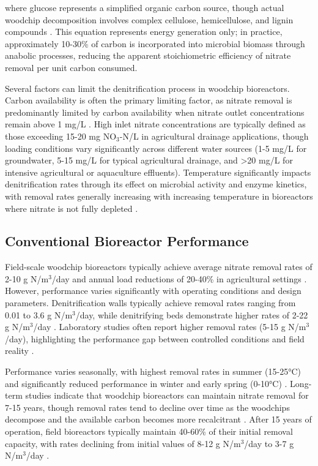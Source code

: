 \documentclass[12pt,a4paper]{article}
\begin{document}
where glucose represents a simplified organic carbon source, though actual woodchip decomposition involves complex cellulose, hemicellulose, and lignin compounds \citep{RN725}. This equation represents energy generation only; in practice, approximately 10-30\% of carbon is incorporated into microbial biomass through anabolic processes, reducing the apparent stoichiometric efficiency of nitrate removal per unit carbon consumed.

Several factors can limit the denitrification process in woodchip bioreactors. Carbon availability is often the primary limiting factor, as nitrate removal is predominantly limited by carbon availability when nitrate outlet concentrations remain above 1 mg/L \citep{RN629, RN242}. High inlet nitrate concentrations are typically defined as those exceeding 15-20 mg NO$_3$-N/L in agricultural drainage applications, though loading conditions vary significantly across different water sources (1-5 mg/L for groundwater, 5-15 mg/L for typical agricultural drainage, and >20 mg/L for intensive agricultural or aquaculture effluents). Temperature significantly impacts denitrification rates through its effect on microbial activity and enzyme kinetics, with removal rates generally increasing with increasing temperature in bioreactors where nitrate is not fully depleted \citep{RN625, RN228, RN258}.

\subsection{Conventional Bioreactor Performance}

Field-scale woodchip bioreactors typically achieve average nitrate removal rates of 2-10 g N/m$^3$/day and annual load reductions of 20-40\% in agricultural settings \citep{RN312, RN310}. However, performance varies significantly with operating conditions and design parameters. Denitrification walls typically achieve removal rates ranging from 0.01 to 3.6 g N/m$^3$/day, while denitrifying beds demonstrate higher rates of 2-22 g N/m$^3$/day \citep{RN625, RN629}. Laboratory studies often report higher removal rates (5-15 g N/m$^3$/day), highlighting the performance gap between controlled conditions and field reality \citep{RN611}.

Performance varies seasonally, with highest removal rates in summer (15-25°C) and significantly reduced performance in winter and early spring (0-10°C) \citep{RN214, RN228, RN258}. Long-term studies indicate that woodchip bioreactors can maintain nitrate removal for 7-15 years, though removal rates tend to decline over time as the woodchips decompose and the available carbon becomes more recalcitrant \citep{RN629, RN958}. After 15 years of operation, field bioreactors typically maintain 40-60\% of their initial removal capacity, with rates declining from initial values of 8-12 g N/m$^3$/day to 3-7 g N/m$^3$/day \citep{RN958}.
\end{document}
